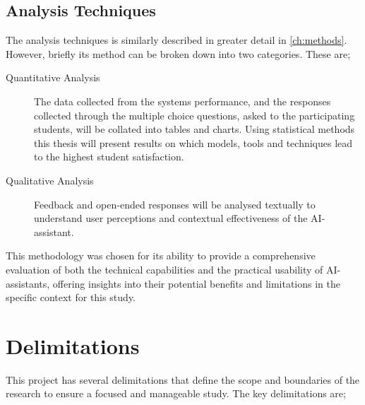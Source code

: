 \subsection{Analysis Techniques}


The analysis techniques is similarly described in greater detail in \autoref{ch:methods}. However, briefly its method can be broken down into two categories. These are;


\begin{description}
        \item[Quantitative Analysis] The data collected from the systems performance, and the responses collected through the multiple choice questions, asked to the participating students, will be collated into tables and charts. Using statistical methods this thesis will present results on which models, tools and techniques lead to the highest student satisfaction.
        \item[Qualitative Analysis] Feedback and open-ended responses will be analysed textually to understand user perceptions and contextual effectiveness of the AI-assistant.
\end{description}


This methodology was chosen for its ability to provide a comprehensive evaluation of both the technical capabilities and the practical usability of AI-assistants, offering insights into their potential benefits and limitations in the specific context for this study.




\section{Delimitations}
\label{sec:delimitations}




This project has several delimitations that define the scope and boundaries of the research to ensure a focused and manageable study. The key delimitations are;


